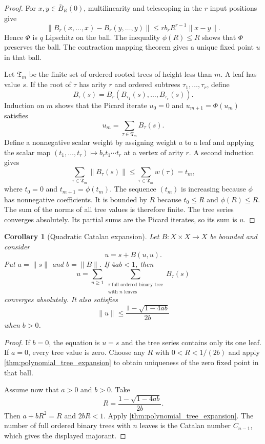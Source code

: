 \documentclass{aomart}
\newtheorem{corollary}[corollary]{Corollary}
\theoremstyle{definition}
\theoremstyle{remark}
\begin{document}
\begin{proof}
For $x,y\in\overline B_R(0)$, multilinearity and telescoping in the $r$ input positions give
\[
\|B_r(x,\ldots,x)-B_r(y,\ldots,y)\|
\le
r b_rR^{r-1}\|x-y\|.
\]
Hence $\Phi$ is $q$ Lipschitz on the ball.  The inequality $\phi(R)\le R$ shows that $\Phi$ preserves the ball.  The contraction mapping theorem gives a unique fixed point $u$ in that ball.

Let $\mathfrak T_m$ be the finite set of ordered rooted trees of height less than $m$.  A leaf has value $s$.  If the root of $\tau$ has arity $r$ and ordered subtrees $\tau_1,\ldots,\tau_r$, define
\[
B_\tau(s)=B_r(B_{\tau_1}(s),\ldots,B_{\tau_r}(s)).
\]
Induction on $m$ shows that the Picard iterate $u_0=0$ and $u_{m+1}=\Phi(u_m)$ satisfies
\[
u_m=\sum_{\tau\in\mathfrak T_m}B_\tau(s).
\]
Define a nonnegative scalar weight by assigning weight $a$ to a leaf and applying the scalar map $(t_1,\ldots,t_r)\mapsto b_rt_1\cdots t_r$ at a vertex of arity $r$.  A second induction gives
\[
\sum_{\tau\in\mathfrak T_m}\|B_\tau(s)\|
\le
\sum_{\tau\in\mathfrak T_m}w(\tau)
=t_m,
\]
where $t_0=0$ and $t_{m+1}=\phi(t_m)$.  The sequence $(t_m)$ is increasing because $\phi$ has nonnegative coefficients.  It is bounded by $R$ because $t_0\le R$ and $\phi(R)\le R$.  The sum of the norms of all tree values is therefore finite.  The tree series converges absolutely.  Its partial sums are the Picard iterates, so its sum is $u$.
\end{proof}

\begin{corollary}[Quadratic Catalan expansion]\label{cor:quadratic_tree_expansion}
Let $B:X\times X\to X$ be bounded and consider
\[
u=s+B(u,u).
\]
Put $a=\|s\|$ and $b=\|B\|$.  If $4ab<1$, then
\[
u=
\sum_{n\ge1}
\sum_{\substack{\tau\text{ full ordered binary tree}\\\text{with }n\text{ leaves}}}
B_\tau(s)
\]
converges absolutely.  It also satisfies
\[
\|u\|
\le
\frac{1-\sqrt{1-4ab}}{2b}
\]
when $b>0$.
\end{corollary}

\begin{proof}
If $b=0$, the equation is $u=s$ and the tree series contains only its one leaf.  If $a=0$, every tree value is zero.  Choose any $R$ with $0<R<1/(2b)$ and apply \cref{thm:polynomial_tree_expansion} to obtain uniqueness of the zero fixed point in that ball.

Assume now that $a>0$ and $b>0$.  Take
\[
R=
\frac{1-\sqrt{1-4ab}}{2b}.
\]
Then $a+bR^2=R$ and $2bR<1$.  Apply \cref{thm:polynomial_tree_expansion}.  The number of full ordered binary trees with $n$ leaves is the Catalan number $C_{n-1}$, which gives the displayed majorant.
\end{proof}
\end{document}
